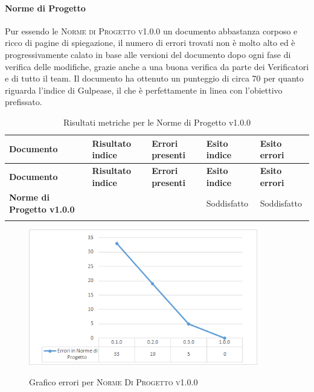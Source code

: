 \documentclass[../piano-di-qualifica.tex]{subfiles}
\begin{document}
\paragraph{Norme di Progetto}
\label{sub:norme_di_progetto}
Pur essendo le \textsc{Norme di Progetto v1.0.0} un documento abbastanza corposo e ricco di pagine di spiegazione, il numero di errori trovati non è molto alto ed è progressivamente calato in base alle versioni del documento dopo ogni fase di verifica delle modifiche, grazie anche a una buona verifica da parte dei Verificatori e di tutto il team.
Il documento ha ottenuto un punteggio di circa 70 per quanto riguarda l'indice di Gulpease, il che è perfettamente in linea con l'obiettivo prefissato.

\renewcommand{\arraystretch}{2} %
\begin{longtable}[H]{>{\centering\bfseries}m{6cm} >{\centering}m{2cm} >{\centering}m{2.5cm} >{\centering}m{2.5cm} >{\centering\arraybackslash}m{2.5cm}}  
  \rowcolor{lightgray}
  {\textbf{Documento}} & {\textbf{Risultato indice}} & {\textbf{Errori presenti}} & {\textbf{Esito indice}} & {\textbf{Esito errori}}  \\
  \endfirsthead%
  \rowcolor{lightgray}
  {\textbf{Documento}} & {\textbf{Risultato indice}} & {\textbf{Errori presenti}} & {\textbf{Esito indice}} & {\textbf{Esito errori}}  \\
  \endhead%
  \textbf{Norme di Progetto v1.0.0} &  70                & 0               & Soddisfatto & Soddisfatto \\
  \caption{Risultati metriche per le Norme di Progetto v1.0.0}
  \label{tab:my-table}
\end{longtable}

    \begin{figure}[H]
        \centering
        \includegraphics[width=10cm]{img/erroriNorme.png}
        \label{fig:scice_documenti}
        \caption{Grafico errori per \textsc{Norme Di Progetto v1.0.0}}
    \end{figure}
\end{document}
